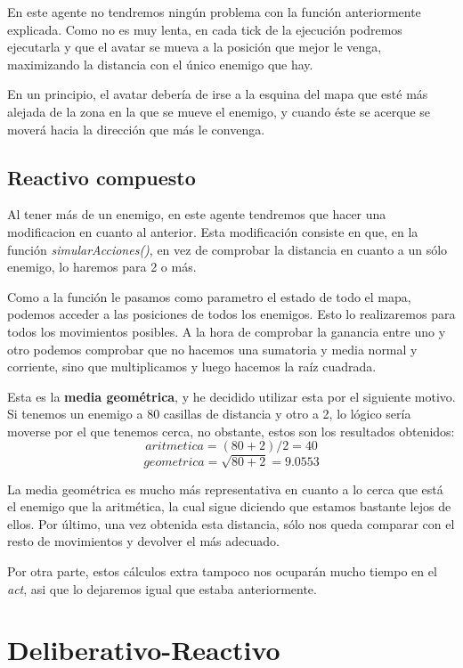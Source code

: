 \documentclass[11pt,a4paper]{article}
\begin{document}
En este agente no tendremos ningún problema con la función anteriormente explicada. Como no es muy lenta, en
cada tick de la ejecución podremos ejecutarla y que el avatar se mueva a la posición que mejor le venga,
maximizando la distancia con el único enemigo que hay.

En un principio, el avatar debería de irse a la esquina del mapa que esté más alejada de la zona en la que
se mueve el enemigo, y cuando éste se acerque se moverá hacia la dirección que más le convenga.


\subsection{Reactivo compuesto}

Al tener más de un enemigo, en este agente tendremos que hacer una modificacion en cuanto al anterior. Esta
modificación consiste en que, en la función \textit{simularAcciones()}, en vez de comprobar la distancia en
cuanto a un sólo enemigo, lo haremos para 2 o más.

Como a la función le pasamos como parametro el estado de todo el mapa, podemos acceder a las posiciones
de todos los enemigos. Esto lo realizaremos para todos los movimientos posibles. A la hora de comprobar la
ganancia entre uno y otro podemos comprobar que no hacemos una sumatoria y media normal y corriente, sino que
multiplicamos y luego hacemos la raíz cuadrada.

Esta es la \textbf{media geométrica}, y he decidido utilizar esta por el siguiente motivo. Si tenemos un enemigo
a 80 casillas de distancia y otro a 2, lo lógico sería moverse por el que tenemos cerca, no obstante, estos son
los resultados obtenidos:
$$aritmetica = (80+2)/2 = 40$$
$$geometrica = \sqrt{80+2} = 9.0553$$

La media geométrica es mucho más representativa en cuanto a lo cerca que está el enemigo que la aritmética, la
cual sigue diciendo que estamos bastante lejos de ellos. Por último, una vez obtenida esta distancia, sólo nos
queda comparar con el resto de movimientos y devolver el más adecuado.

Por otra parte, estos cálculos extra tampoco nos ocuparán mucho tiempo en el \textit{act}, asi que lo dejaremos
igual que estaba anteriormente.


\newpage

\section{Deliberativo-Reactivo}
\end{document}
